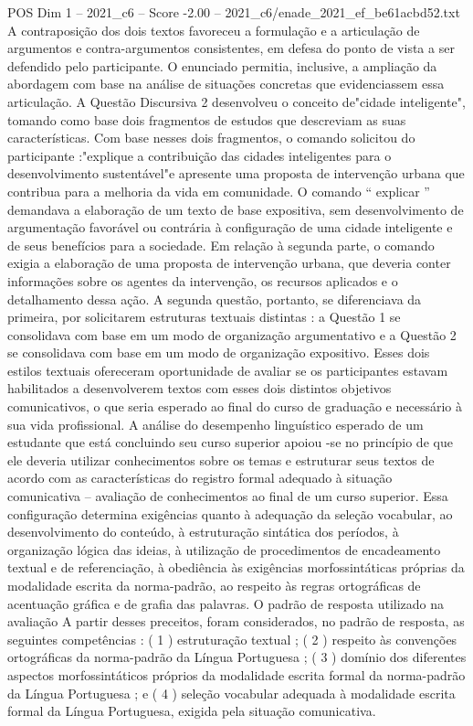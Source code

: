 \begin{textsample}{POS Dim 1 – 2021\_c6 – Score -2.00 – 2021\_c6/enade\_2021\_ef\_be61acbd52.txt}
A contraposição dos dois textos favoreceu a formulação e a articulação de argumentos e contra-argumentos consistentes, em defesa do ponto de vista a ser defendido pelo participante.
O enunciado permitia, inclusive, a ampliação da abordagem com base na análise de situações concretas que evidenciassem essa articulação.
A Questão Discursiva 2 desenvolveu o conceito de"cidade inteligente", tomando como base dois fragmentos de estudos que descreviam as suas características.
Com base nesses dois fragmentos, o comando solicitou do participante :"explique a contribuição das cidades inteligentes para o desenvolvimento sustentável"e apresente uma proposta de intervenção urbana que contribua para a melhoria da vida em comunidade.
O comando “ explicar ” demandava a elaboração de um texto de base expositiva, sem desenvolvimento de argumentação favorável ou contrária à configuração de uma cidade inteligente e de seus benefícios para a sociedade.
Em relação à segunda parte, o comando exigia a elaboração de uma proposta de intervenção urbana, que deveria conter informações sobre os agentes da intervenção, os recursos aplicados e o detalhamento dessa ação.
A segunda questão, portanto, se diferenciava da primeira, por solicitarem estruturas textuais distintas : a Questão 1 se consolidava com base em um modo de organização argumentativo e a Questão 2 se consolidava com base em um modo de organização expositivo.
Esses dois estilos textuais ofereceram oportunidade de avaliar se os participantes estavam habilitados a desenvolverem textos com esses dois distintos objetivos comunicativos, o que seria esperado ao final do curso de graduação e necessário à sua vida profissional.
A análise do desempenho linguístico esperado de um estudante que está concluindo seu curso superior apoiou -se no princípio de que ele deveria utilizar conhecimentos sobre os temas e estruturar seus textos de acordo com as características do registro formal adequado à situação comunicativa – avaliação de conhecimentos ao final de um curso superior.
Essa configuração determina exigências quanto à adequação da seleção vocabular, ao desenvolvimento do conteúdo, à estruturação sintática dos períodos, à organização lógica das ideias, à utilização de procedimentos de encadeamento textual e de referenciação, à obediência às exigências morfossintáticas próprias da modalidade escrita da norma-padrão, ao respeito às regras ortográficas de acentuação gráfica e de grafia das palavras.
O padrão de resposta utilizado na avaliação A partir desses preceitos, foram considerados, no padrão de resposta, as seguintes competências : ( 1 ) estruturação textual ; ( 2 ) respeito às convenções ortográficas da norma-padrão da Língua Portuguesa ; ( 3 ) domínio dos diferentes aspectos morfossintáticos próprios da modalidade escrita formal da norma-padrão da Língua Portuguesa ; e ( 4 ) seleção vocabular adequada à modalidade escrita formal da Língua Portuguesa, exigida pela situação comunicativa.

\end{textsample}
